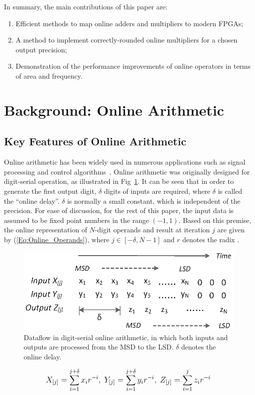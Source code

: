 \documentclass[conference]{IEEEtran}
\begin{document}
In summary, the main contributions of this paper are:\vspace{-0.5ex}
\begin{enumerate}
    \item Efficient methods to map online adders and multipliers to modern FPGAs;
    \item A method to implement correctly-rounded online multipliers for a chosen output precision;
    \item Demonstration of the performance improvements of online operators in terms of area and frequency.
\end{enumerate}\vspace{-1ex}


\section{Background: Online Arithmetic}\label{Sec:Background}\vspace{-0.5ex}
\subsection{Key Features of Online Arithmetic}\vspace{-0.5ex}

Online arithmetic has been widely used in numerous applications such as signal processing and control algorithms~\cite{Online_FPGADSP,Online_Control}. Online arithmetic was originally designed for digit-serial operation, as illustrated in Fig~\ref{Fig:OnlineDataFlow}. It can be seen that in order to generate the first output digit, $\delta$ digits of inputs are required, where $\delta$ is called the ``online delay''. $\delta$ is normally a small constant, which is independent of the precision. For ease of discussion, for the rest of this paper, the input data is assumed to be fixed point numbers in the range $(-1,1)$. Based on this premise, the online representation of $N$-digit operands and result at iteration $j$ are given by (\ref{Eq:Online_Operands}), where $j\in[-\delta,N-1]$ and $r$ denotes the radix \cite{Ercegovac_Book}.\vspace{-0.5ex}
%
\begin{figure}[tbp]
  \centering
  \includegraphics[width=.48\textwidth]{./Figures/OnlineArithmetic_DataFlow.eps}
  \vspace{-4ex}
  \caption{Dataflow in digit-serial online arithmetic, in which both inputs and outputs are processed from the MSD to the LSD. $\delta$ denotes the online delay.}
  \vspace{-1ex}
  \label{Fig:OnlineDataFlow}
\end{figure}
%
\begin{eqnarray}\label{Eq:Online_Operands}
\footnotesize
  X_{[j]}=\sum_{i=1}^{j+\delta}x_ir^{-i},~Y_{[j]}=\sum_{i=1}^{j+\delta}y_ir^{-i},~Z_{[j]}=\sum_{i=1}^{j}z_ir^{-i}
\normalsize
\end{eqnarray}
\end{document}
